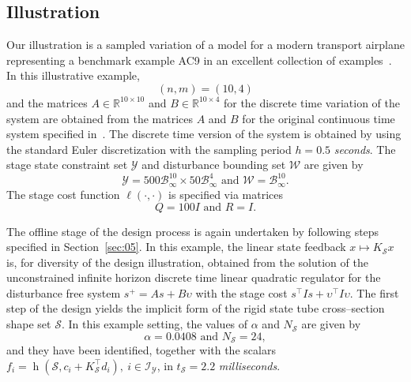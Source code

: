 \documentclass[twocolumn]{autart}
\newcommand{\mb}[1]{\mathbb{#1}}
\newcommand{\mc}[1]{\mathcal{#1}}
\newcommand{\bbb}{\left(\cdot,\cdot\right)}
\newcommand{\R}{\mb{R}}
\newcommand{\Rnm}[2]{\R^{{#1}\times{#2}}}
\newcommand{\support}[2]{\operatorname{h}(#1,#2)}
\numberwithin{equation}{section}
\begin{document}
\subsection{Illustration}
\label{sec:06.02}
Our illustration is a sampled variation of a model for a modern transport airplane representing a benchmark example AC9 in an excellent collection of examples~\cite{leibfritz:2004}. In this  illustrative example, 
\begin{equation*}
(n,m)=(10,4)
\end{equation*}
and the matrices $A\in\Rnm{10}{10}$ and $B\in\Rnm{10}{4}$ for the discrete time variation of the system are obtained from the matrices $A$ and $B$ for the original continuous time system specified in~\cite[Example AC9, Page 6]{leibfritz:2004}. The discrete time version of the system is obtained by using the standard Euler discretization with the sampling period $h=0.5$ \emph{seconds}. The stage state constraint set $\mc{Y}$ and disturbance bounding set $\mc{W}$ are given by
\begin{equation*}
\mc{Y}=500\mc{B}_\infty^{10}\times50\mc{B}_\infty^4 \text{ and }\mc{W}=\mc{B}_\infty^{10}.
\end{equation*}
The stage cost function $\ell\bbb$ is specified via matrices
\begin{equation*}
Q=100I\text{ and }R=I.
\end{equation*}

The offline stage of the design process is again undertaken by following steps specified in Section~\ref{sec:05}. In this example, the linear state feedback $x\mapsto K_\mc{S}x$ is, for diversity of the design illustration, obtained from the solution of the unconstrained infinite horizon discrete time linear quadratic regulator for the disturbance free system $s^+=As+B\upsilon$ with the stage cost $s^\top I s+\upsilon^\top I \upsilon$.  The first step of the design yields the implicit form of the rigid state tube cross--section shape set $\mc{S}$. In this example setting, the values of $\alpha$ and $N_\mc{S}$ are given by 
\begin{equation*}
\alpha=0.0408\text{ and }N_\mc{S}=24,
\end{equation*}
and they have been identified, together with the scalars $f_i=\support{\mc{S}}{c_i+K_\mc{S}^\top d_i},\ i\in\mc{I}_\mc{Y}$, in $t_\mc{S}=2.2$ \emph{milliseconds}. 
\end{document}
